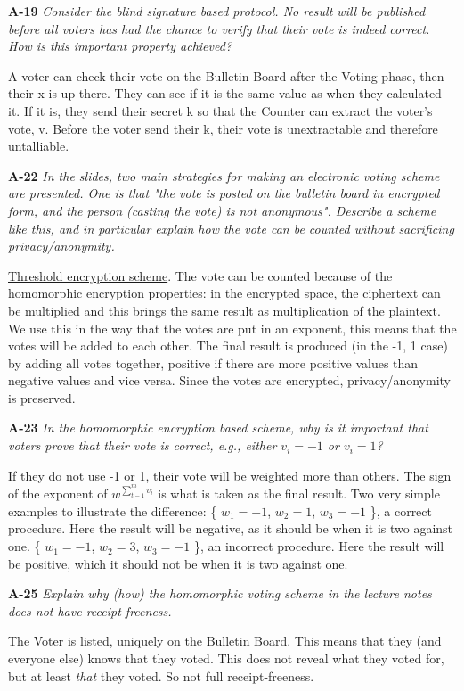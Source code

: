 \documentclass[a4paper]{article}
\newcommand{\Q}[2]{ \vspace{10pt} \textbf{A-#1} \textit{#2} }
\newcommand{\A}[1]{ #1 }
\begin{document}
\Q{19} {
  Consider the blind signature based protocol. No result will be published 
  before all voters has had the
  chance to verify that their vote is indeed correct. How is this important 
  property achieved?
  }

\A{

  A voter can check their vote on the Bulletin Board after the Voting phase,
  then their x is up there. They can see if it is the same value as when they
  calculated it. If it is, they send their secret k so that the Counter
  can extract the voter's vote, v. Before the voter send their k, 
  their vote is unextractable and therefore untalliable.
}

\Q{22} {
  In the slides, two main strategies for making an electronic voting scheme are 
  presented. One is
  that "the vote is posted on the bulletin board in encrypted form, and the 
  person (casting the vote) is not
  anonymous". Describe a scheme like this, and in particular explain how the  
  vote can be counted without sacrificing privacy/anonymity.
}

\A{
  \underline{Threshold encryption scheme}. 
  The vote can be counted because of the homomorphic encryption properties:
  in the encrypted space, the ciphertext can be multiplied and this
  brings the same result as multiplication of the plaintext. 
  We use this in the way that the votes are put in an exponent, this means
  that the votes will be added to each other. The final result is produced
  (in the -1, 1 case) by adding all votes together, positive if there are
  more positive values than negative values and vice versa. Since the 
  votes are encrypted, privacy/anonymity is preserved.
}

\Q{23} {
  In the homomorphic encryption based scheme, why is it important that voters 
  prove that their vote is correct, e.g., either $v_i = -1$ or $v_i = 1$?
}

\A{
  If they do not use -1 or 1, their vote will be weighted more than others.
  The sign of the exponent of $w^{\sum_{t-1}^{m} v_i}$ is what is taken as the
  final result. Two very simple examples to illustrate the difference:
  \{ $w_1 = -1$, $w_2 = 1$, $w_3 = -1$ \}, a correct procedure. Here the result will be negative, as it should be when it is two against one. 
  \{ $w_1 = -1$, $w_2 = 3$, $w_3 = -1$ \}, an incorrect procedure. Here the result
  will be positive, which it should not be when it is
  two against one.
}

\Q{25} {
  Explain why (how) the homomorphic voting scheme in the lecture notes 
  does not have receipt-freeness.
}

\A{
  The Voter is listed, uniquely on the Bulletin Board. This means that they
  (and everyone else) knows that they voted. This does not reveal what they 
  voted for, but at least \textit{that} they voted. So not full 
  receipt-freeness.
}
\end{document}
